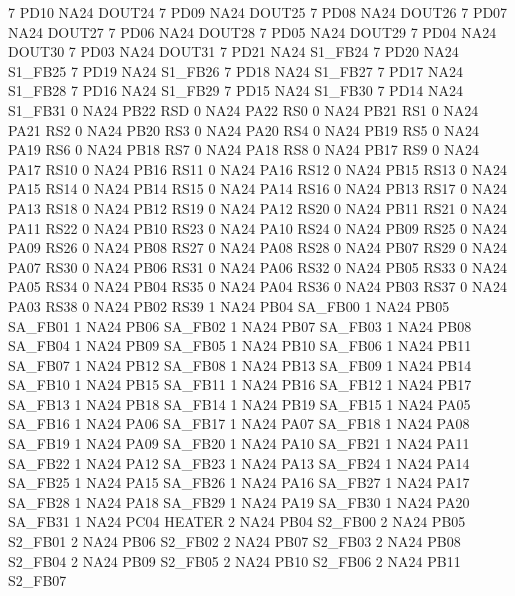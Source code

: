 7   PD10    NA24    DOUT24
7   PD09    NA24    DOUT25
7   PD08    NA24    DOUT26
7   PD07    NA24    DOUT27
7   PD06    NA24    DOUT28
7   PD05    NA24    DOUT29
7   PD04    NA24    DOUT30
7   PD03    NA24    DOUT31
7   PD21    NA24    S1_FB24
7   PD20    NA24    S1_FB25
7   PD19    NA24    S1_FB26
7   PD18    NA24    S1_FB27
7   PD17    NA24    S1_FB28
7   PD16    NA24    S1_FB29
7   PD15    NA24    S1_FB30
7   PD14    NA24    S1_FB31
0   NA24    PB22    RSD
0   NA24    PA22    RS0
0   NA24    PB21    RS1
0   NA24    PA21    RS2
0   NA24    PB20    RS3
0   NA24    PA20    RS4
0   NA24    PB19    RS5
0   NA24    PA19    RS6
0   NA24    PB18    RS7
0   NA24    PA18    RS8
0   NA24    PB17    RS9
0   NA24    PA17    RS10
0   NA24    PB16    RS11
0   NA24    PA16    RS12
0   NA24    PB15    RS13
0   NA24    PA15    RS14
0   NA24    PB14    RS15
0   NA24    PA14    RS16
0   NA24    PB13    RS17
0   NA24    PA13    RS18
0   NA24    PB12    RS19
0   NA24    PA12    RS20
0   NA24    PB11    RS21
0   NA24    PA11    RS22
0   NA24    PB10    RS23
0   NA24    PA10    RS24
0   NA24    PB09    RS25
0   NA24    PA09    RS26
0   NA24    PB08    RS27
0   NA24    PA08    RS28
0   NA24    PB07    RS29
0   NA24    PA07    RS30
0   NA24    PB06    RS31
0   NA24    PA06    RS32
0   NA24    PB05    RS33
0   NA24    PA05    RS34
0   NA24    PB04    RS35
0   NA24    PA04    RS36
0   NA24    PB03    RS37
0   NA24    PA03    RS38
0   NA24    PB02    RS39
1   NA24    PB04    SA_FB00
1   NA24    PB05    SA_FB01
1   NA24    PB06    SA_FB02
1   NA24    PB07    SA_FB03
1   NA24    PB08    SA_FB04
1   NA24    PB09    SA_FB05
1   NA24    PB10    SA_FB06
1   NA24    PB11    SA_FB07
1   NA24    PB12    SA_FB08
1   NA24    PB13    SA_FB09
1   NA24    PB14    SA_FB10
1   NA24    PB15    SA_FB11
1   NA24    PB16    SA_FB12
1   NA24    PB17    SA_FB13
1   NA24    PB18    SA_FB14
1   NA24    PB19    SA_FB15
1   NA24    PA05    SA_FB16
1   NA24    PA06    SA_FB17
1   NA24    PA07    SA_FB18
1   NA24    PA08    SA_FB19
1   NA24    PA09    SA_FB20
1   NA24    PA10    SA_FB21
1   NA24    PA11    SA_FB22
1   NA24    PA12    SA_FB23
1   NA24    PA13    SA_FB24
1   NA24    PA14    SA_FB25
1   NA24    PA15    SA_FB26
1   NA24    PA16    SA_FB27
1   NA24    PA17    SA_FB28
1   NA24    PA18    SA_FB29
1   NA24    PA19    SA_FB30
1   NA24    PA20    SA_FB31
1   NA24    PC04    HEATER
2   NA24    PB04    S2_FB00
2   NA24    PB05    S2_FB01
2   NA24    PB06    S2_FB02
2   NA24    PB07    S2_FB03
2   NA24    PB08    S2_FB04
2   NA24    PB09    S2_FB05
2   NA24    PB10    S2_FB06
2   NA24    PB11    S2_FB07

